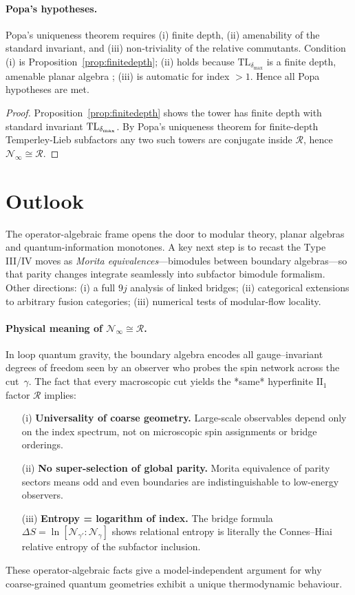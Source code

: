 \documentclass[11pt]{article}
\begin{document}
\paragraph{Popa's hypotheses.}
Popa’s uniqueness theorem requires (i) finite depth,
(ii) amenability of the standard invariant, and
(iii) non-triviality of the relative commutants.
Condition (i) is Proposition~\ref{prop:finitedepth};
(ii) holds because $\mathrm{TL}_{\delta_{\max}}$ is a
finite depth, amenable planar algebra \cite{JonesPA};
(iii) is automatic for index $>1$.  Hence all Popa hypotheses are met.

\begin{proof}
Proposition~\ref{prop:finitedepth} shows the tower has finite depth with
standard invariant ${\rm TL}_{\delta_{\max}}$.
By Popa's uniqueness theorem for finite-depth Temperley-Lieb
subfactors \cite{PopaCBMS} any two such towers are conjugate inside
$\mathcal R$, hence $\mathcal N_{\infty}\cong\mathcal R$.
\end{proof}

\section{Outlook}
The operator-algebraic frame opens the door to modular theory, planar
algebras and quantum-information monotones.  A key next step is to recast the
Type III/IV moves as \emph{Morita equivalences}—bimodules between boundary
algebras—so that parity changes integrate seamlessly into subfactor bimodule
formalism.  Other directions: (i) a full $9j$ analysis of linked bridges; (ii)
categorical extensions to arbitrary fusion categories; (iii) numerical tests of
modular-flow locality.

\paragraph{Physical meaning of $\mathcal N_{\infty}\cong\mathcal R$.}
In loop quantum gravity, the boundary algebra encodes all gauge–invariant
degrees of freedom seen by an observer who probes the spin network across the
cut~$\gamma$.  
The fact that every macroscopic cut yields the *same* hyperfinite
$\mathrm{II}_1$ factor $\mathcal R$ implies:

\begin{enumerate}
\item[(i)] \textbf{Universality of coarse geometry.}  
      Large-scale observables depend only on the index spectrum, not on
      microscopic spin assignments or bridge orderings.
\item[(ii)] \textbf{No super-selection of global parity.}  
      Morita equivalence of parity sectors means odd and even boundaries are
      indistinguishable to low-energy observers.
\item[(iii)] \textbf{Entropy = logarithm of index.}  
      The bridge formula $\Delta S=\ln[\mathcal N_{\gamma'}:\mathcal N_{\gamma}]$
      shows relational entropy is literally the Connes–Hiai relative entropy
      of the subfactor inclusion.
\end{enumerate}
These operator-algebraic facts give a model-independent argument for why
coarse-grained quantum geometries exhibit a unique thermodynamic behaviour.
\end{document}
